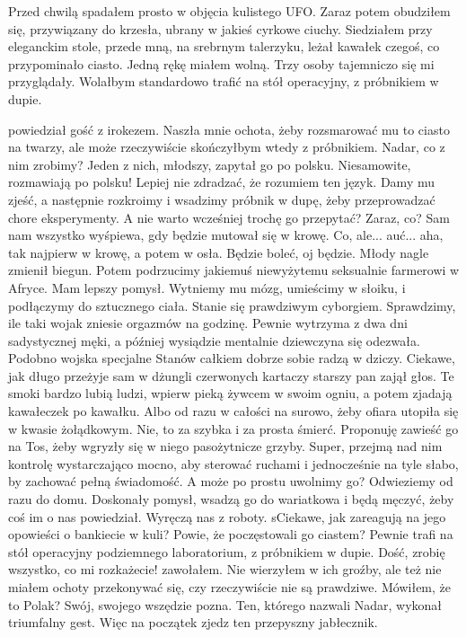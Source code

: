 Przed chwilą spadałem prosto w objęcia kulistego UFO. Zaraz potem obudziłem się, przywiązany do krzesła, ubrany w jakieś cyrkowe ciuchy.
Siedziałem przy eleganckim stole, przede mną, na srebrnym talerzyku, leżał kawałek czegoś, co przypominało ciasto. Jedną rękę miałem wolną.
Trzy osoby tajemniczo się mi przyglądały. Wolałbym standardowo trafić na stół operacyjny, z próbnikiem w dupie.
\begin{dialogue}
\ds{}  \dm{} powiedział gość z irokezem. Naszła mnie ochota, żeby rozsmarować mu to ciasto na twarzy, ale może rzeczywiście skończyłbym wtedy z próbnikiem.
\ds{} Nadar, co z nim zrobimy? \dm{} Jeden z nich, młodszy, zapytał go po polsku. Niesamowite, rozmawiają po polsku! Lepiej nie zdradzać, że rozumiem ten język.
\ds{} Damy mu zjeść, a następnie rozkroimy i wsadzimy próbnik w dupę, żeby przeprowadzać chore eksperymenty.
\ds{} A nie warto wcześniej trochę go przepytać? Zaraz, co?
\ds{} Sam nam wszystko wyśpiewa, gdy będzie mutował się w krowę.
\ds{} Co, ale... auć... aha, tak najpierw w krowę, a potem w osła. Będzie boleć, oj będzie. \dm{} Młody nagle zmienił biegun.
\ds{} Potem podrzucimy jakiemuś niewyżytemu seksualnie farmerowi w Afryce.
\ds{} Mam lepszy pomysł. Wytniemy mu mózg, umieścimy w słoiku, i podłączymy do sztucznego ciała. Stanie się prawdziwym cyborgiem.
\ds{} Sprawdzimy, ile taki wojak zniesie orgazmów na godzinę. Pewnie wytrzyma z dwa dni sadystycznej męki, a później wysiądzie mentalnie \dm{} dziewczyna się odezwała.
\ds{} Podobno wojska specjalne Stanów całkiem dobrze sobie radzą w dziczy. Ciekawe, jak długo przeżyje sam w dżungli czerwonych kartaczy \dm{} starszy pan zajął głos. \dm{}
Te smoki bardzo lubią ludzi, wpierw pieką żywcem w swoim ogniu, a potem zjadają kawałeczek po kawałku.
\ds{} Albo od razu w całości na surowo, żeby ofiara utopiła się w kwasie żołądkowym.
\ds{} Nie, to za szybka i za prosta śmierć. Proponuję zawieść go na Tos, żeby wgryzły się w niego pasożytnicze grzyby.
\ds{} Super, przejmą nad nim kontrolę wystarczająco mocno, aby sterować ruchami i jednocześnie na tyle słabo, by zachować pełną świadomość.
\ds{} A może po prostu uwolnimy go? Odwieziemy od razu do domu.
\ds{} Doskonały pomysł, wsadzą go do wariatkowa i będą męczyć, żeby coś im o nas powiedział. Wyręczą nas z roboty. 
sCiekawe, jak zareagują na jego opowieści o bankiecie w kuli? Powie, że poczęstowali go ciastem?
\ds{} Pewnie trafi na stół operacyjny podziemnego laboratorium, z próbnikiem w dupie.
\ds{} Dość, zrobię wszystko, co mi rozkażecie! \dm{} zawołałem. Nie wierzyłem w ich groźby, ale też nie miałem ochoty przekonywać się, czy rzeczywiście nie są prawdziwe.
\ds{} Mówiłem, że to Polak? Swój, swojego wszędzie pozna. \dm{} Ten, którego nazwali Nadar, wykonał triumfalny gest. \dm{} Więc na początek zjedz ten przepyszny jabłecznik.
\end{dialogue}

